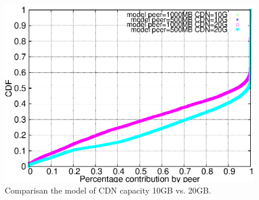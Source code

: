 \documentclass[conference]{IEEEtran}
\begin{document}
\begin{figure}[th]
\begin{center}
\includegraphics[scale=0.6]{graphs/hit-model-500MBvs-1000MB-10G-20G-cdf.eps}
\end{center}
\caption{Comparisan the model of CDN capacity 10GB vs. 20GB.}
\label{fig:10Gvs20G}
\vspace{-2mm}
\end{figure} 



\end{document}

